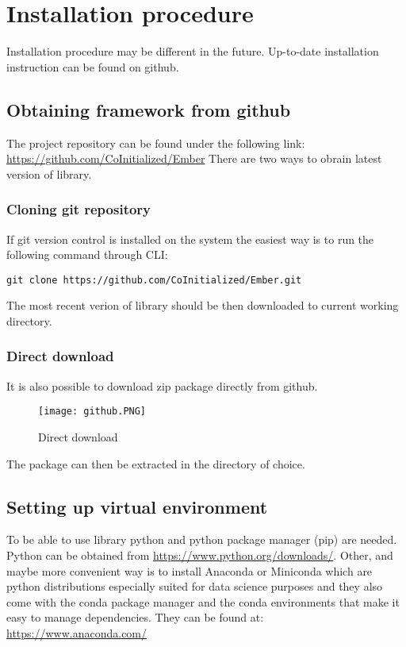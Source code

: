 \documentclass[a4paper,twoside,12pt]{book}
\begin{document}
\section{Installation procedure}

Installation procedure may be different in the future. Up-to-date installation instruction can be found on github.

\subsection{Obtaining framework from github}

The project repository can be found under the following link: \url{https://github.com/CoInitialized/Ember}
There are two ways to obrain latest version of library.
\subsubsection{Cloning git repository}
If git version control is installed on the system the easiest way is to run the following command through CLI:
\begin{verbatim}
git clone https://github.com/CoInitialized/Ember.git
\end{verbatim}
The most recent verion of library should be then downloaded to current working directory.
\subsubsection{Direct download}
It is also possible to download zip package directly from github.

\begin{figure}[!h]
    \centering
    \texttt{[image: github.PNG]}
    \caption{Direct download}
    \label{fig:mesh1}
\end{figure}

The package can then be extracted in the directory of choice.


\subsection{Setting up virtual environment}

To be able to use library python and python package manager (pip) are needed.
Python can be obtained from \url{https://www.python.org/downloads/}. 
Other, and maybe more convenient way is to install Anaconda or Miniconda which are python distributions especially suited for data science purposes and they also come with the conda package manager and the conda environments that make it easy to manage dependencies. They can be found at: 
\url{https://www.anaconda.com/}
\end{document}
